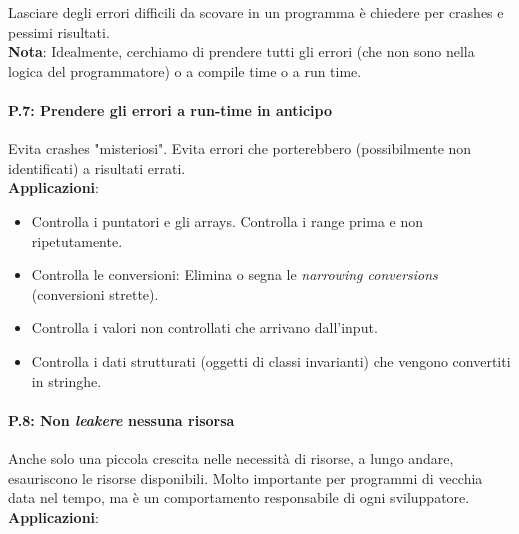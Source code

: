 \textsf{\small Lasciare degli errori difficili da scovare in un programma è chiedere per crashes e pessimi risultati.} \\

\textsf{\small \textbf{Nota}: Idealmente, cerchiamo di prendere tutti gli errori (che non sono nella logica del programmatore) o a compile time o a run time.} \\


\paragraph{P.7: Prendere gli errori a run-time in anticipo} %

\textsf{\small Evita crashes "misteriosi". Evita errori che porterebbero (possibilmente non identificati) a risultati errati.} \\

\textsf{\small \textbf{Applicazioni}: } \\

\begin{itemize}
	\item \textsf{\small Controlla i puntatori e gli arrays. Controlla i range prima e non ripetutamente.}
	\item \textsf{\small Controlla le conversioni: Elimina o segna le \emph{narrowing conversions} (conversioni strette).}
	\item \textsf{\small Controlla i valori non controllati che arrivano dall'input.}
	\item \textsf{\small Controlla i dati strutturati (oggetti di classi invarianti) che vengono convertiti in stringhe.}
\end{itemize}

\paragraph{P.8: Non \emph{leakere} nessuna risorsa}

\textsf{\small Anche solo una piccola crescita nelle necessità di risorse, a lungo andare, esauriscono le risorse disponibili. Molto importante per programmi di vecchia data nel tempo, ma è un comportamento responsabile di ogni sviluppatore.} \\

\textsf{\small \textbf{Applicazioni}: } 

